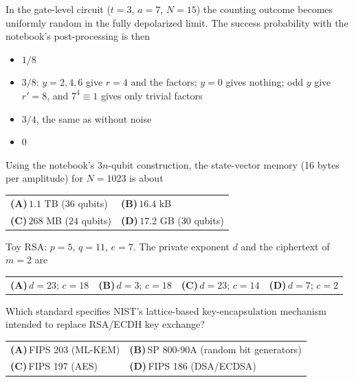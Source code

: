 \documentclass[11pt,a4paper]{article}
\newcommand{\optlabel}[1]{\textbf{(#1)}}
\newenvironment{qitem}[1]{\begin{list}{}{\setlength{\leftmargin}{3.3em}\setlength{\labelwidth}{3.1em}%
  \setlength{\labelsep}{0.2em}\setlength{\topsep}{3pt}\setlength{\parsep}{3pt}}\item[\textbf{Q.#1}\hfill]}{\end{list}}
\newcommand{\qsep}{\par\vspace{2pt}{\color{black!15}\hrule}\vspace{4pt}}
\begin{document}
\begin{qitem}{70}
In the gate-level circuit ($t = 3$, $a = 7$, $N = 15$) the counting outcome becomes uniformly random in the fully depolarized limit. The success
probability with the notebook's post-processing is then
\begin{itemize}[leftmargin=2.6em, labelsep=0.4em, itemsep=2pt, topsep=3pt]
\item[\optlabel{A}] $1/8$
\item[\optlabel{B}] $3/8$: $y = 2, 4, 6$ give $r = 4$ and the factors; $y = 0$ gives nothing; odd $y$ give $r' = 8$, and $7^4 \equiv 1$ gives only trivial factors
\item[\optlabel{C}] $3/4$, the same as without noise
\item[\optlabel{D}] $0$
\end{itemize}
\end{qitem}
\qsep

\begin{qitem}{71}
Using the notebook's $3n$-qubit construction, the state-vector memory (16 bytes per amplitude) for $N = 1023$ is about
\par\smallskip\noindent\begin{tabularx}{\linewidth}{@{}*{2}{L}@{}}
\optlabel{A}\,$1.1$ TB ($36$ qubits) & \optlabel{B}\,$16.4$ kB \\[3pt]
\optlabel{C}\,$268$ MB ($24$ qubits) & \optlabel{D}\,$17.2$ GB ($30$ qubits)
\end{tabularx}
\end{qitem}
\qsep

\begin{qitem}{72}
Toy RSA: $p = 5$, $q = 11$, $e = 7$. The private exponent $d$ and the ciphertext of $m = 2$ are
\par\smallskip\noindent\begin{tabularx}{\linewidth}{@{}*{4}{L}@{}}
\optlabel{A}\,$d = 23$; $c = 18$ & \optlabel{B}\,$d = 3$; $c = 18$ & \optlabel{C}\,$d = 23$; $c = 14$ & \optlabel{D}\,$d = 7$; $c = 2$
\end{tabularx}
\end{qitem}
\qsep

\begin{qitem}{73}
Which standard specifies NIST's lattice-based key-encapsulation mechanism intended to replace RSA/ECDH key exchange?
\par\smallskip\noindent\begin{tabularx}{\linewidth}{@{}*{2}{L}@{}}
\optlabel{A}\,FIPS 203 (ML-KEM) & \optlabel{B}\,SP 800-90A (random bit generators) \\[3pt]
\optlabel{C}\,FIPS 197 (AES) & \optlabel{D}\,FIPS 186 (DSA/ECDSA)
\end{tabularx}
\end{qitem}
\qsep
\end{document}
